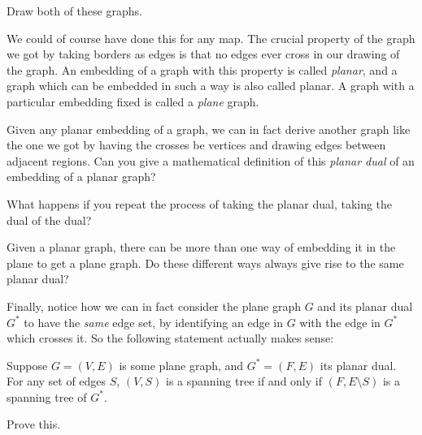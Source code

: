 \documentclass[nobib]{tufte-handout}
\begin{document}
\begin{xca}
  Draw both of these graphs.
\end{xca}

\begin{xca}
  We could of course have done this for any map. The crucial property of the graph we got by taking borders as edges is that no edges ever cross in our drawing of the graph. An embedding of a graph with this property is called \emph{planar}, and a graph which can be embedded in such a way is also called planar. A graph with a particular embedding fixed is called a \emph{plane} graph.

  Given any planar embedding of a graph, we can in fact derive another graph like the one we got by having the crosses be vertices and drawing edges between adjacent regions. Can you give a mathematical definition of this \emph{planar dual} of an embedding of a planar graph?
\end{xca}

\begin{xca}
  What happens if you repeat the process of taking the planar dual, taking the dual of the dual?
\end{xca}

\begin{xca}
  Given a planar graph, there can be more than one way of embedding it in the plane to get a plane graph. Do these different ways always give rise to the same planar dual?
\end{xca}

Finally, notice how we can in fact consider the plane graph $G$ and its planar dual $G^*$ to have the \emph{same} edge set, by identifying an edge in $G$ with the edge in $G^*$ which crosses it. So the following statement actually makes sense:

\begin{lemma}
  Suppose $G = (V,E)$ is some plane graph, and $G^* = (F, E)$ its planar dual. For any set of edges $S$, $(V, S)$ is a spanning tree if and only if $(F, E \setminus S)$ is a spanning tree of $G^*$.
\end{lemma}

\begin{xca}
  Prove this.
\end{xca}
%
%
\end{document}
